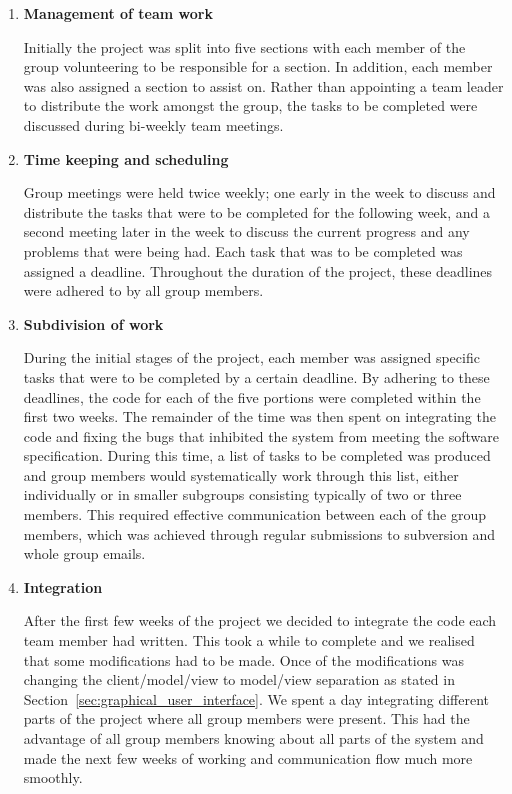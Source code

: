 \begin{enumerate}

	\item \textbf{Management of team work}

		Initially the project was split into five sections with each member of
		the group volunteering to be responsible for a section. In addition,
		each member was also assigned a section to assist on. Rather than
		appointing a team leader to distribute the work amongst the group, the
		tasks to be completed were discussed during bi-weekly team meetings.

	\item \textbf{Time keeping and scheduling}

		Group meetings were held twice weekly; one early in the week to discuss
		and distribute the tasks that were to be completed for the following
		week, and a second meeting later in the week to discuss the current
		progress and any problems that were being had. Each task that was to be
		completed was assigned a deadline. Throughout the duration of the
		project, these deadlines were adhered to by all group members.

	\item \textbf{Subdivision of work}

		During the initial stages of the project, each member was assigned
		specific tasks that were to be completed by a certain deadline. By
		adhering to these deadlines, the code for each of the five portions
		were completed within the first two weeks. The remainder of the time
		was then spent on integrating the code and fixing the bugs that
		inhibited the system from meeting the software specification. During
		this time, a list of tasks to be completed was produced and group
		members would systematically work through this list, either
		individually or in smaller subgroups consisting typically of two or
		three members. This required effective communication between each of
		the group members, which was achieved through regular submissions to
		subversion and whole group emails.

	\item \textbf{Integration}

		After the first few weeks of the project we decided to integrate the
		code each team member had written. This took a while to complete and we
		realised that some modifications had to be made.  Once of the
		modifications was changing the client/model/view to model/view
		separation as stated in Section~\ref{sec:graphical_user_interface}. We
		spent a day integrating	different parts of the project where all group
		members were present. This had the advantage of all group members
		knowing about all parts of the system and made the next few weeks of
		working and communication flow much more smoothly.

\end{enumerate}
